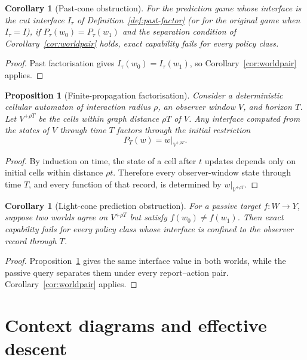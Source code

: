 \documentclass[11pt]{article}
\theoremstyle{plain}
\newtheorem{proposition}[theorem]{Proposition}
\newtheorem{corollary}[theorem]{Corollary}
\theoremstyle{definition}
\theoremstyle{remark}
\begin{document}
\begin{corollary}[Past-cone obstruction]\label{cor:pastcone}
For the prediction game whose interface is the cut interface $I_\tau$ of Definition~\ref{def:past-factor}
(or for the original game when $I_\tau=I$), if $P_\tau(w_0)=P_\tau(w_1)$ and
the separation condition of Corollary~\ref{cor:worldpair} holds, exact
capability fails for every policy class.
\end{corollary}

\begin{proof}
Past factorisation gives $I_\tau(w_0)=I_\tau(w_1)$, so
Corollary~\ref{cor:worldpair} applies.
\end{proof}

\begin{proposition}[Finite-propagation factorisation]\label{prop:lightcone}
Consider a deterministic cellular automaton of interaction radius $\rho$, an
observer window $V$, and horizon $T$. Let
$V^{+\rho T}$ be the cells within graph distance $\rho T$ of $V$. Any interface
computed from the states of $V$ through time $T$ factors through the initial
restriction
\[
P_T(w)=w|_{V^{+\rho T}}.
\]
\end{proposition}

\begin{proof}
By induction on time, the state of a cell after $t$ updates depends only on
initial cells within distance $\rho t$. Therefore every observer-window state
through time $T$, and every function of that record, is determined by
$w|_{V^{+\rho T}}$.
\end{proof}

\begin{corollary}[Light-cone prediction obstruction]\label{cor:lightcone}
For a passive target $f:W\to Y$, suppose two worlds agree on
$V^{+\rho T}$ but satisfy $f(w_0)\ne f(w_1)$. Then exact capability fails for
every policy class whose interface is confined to the observer record through
$T$.
\end{corollary}

\begin{proof}
Proposition~\ref{prop:lightcone} gives the same interface value in both worlds,
while the passive query separates them under every report--action pair.
Corollary~\ref{cor:worldpair} applies.
\end{proof}

\section{Context diagrams and effective descent}\label{sec:descent}
\end{document}
